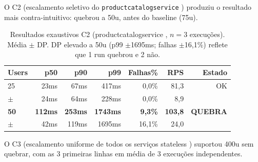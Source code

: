 \documentclass[manuscript,oneside]{acmart}
\begin{document}
O C2 (escalamento seletivo do \texttt{productcatalogservice} ) produziu o resultado mais contra-intuitivo: quebrou a 50u, antes do baseline (75u).

\begin{table}[H]
\caption{Resultados exaustivos C2 (productcatalogservice , $n=3$ execuções). Média $\pm$ DP. DP elevado a 50u (p99 $\pm$1695ms; falhas $\pm$16,1\%) reflete que 1 run quebrou e 2 não.}
\label{tab:c2ex}
\begin{tabular}{lrrrrrr}
\toprule
\textbf{Users} & \textbf{p50} & \textbf{p90} & \textbf{p99} & \textbf{Falhas\%} & \textbf{RPS} & \textbf{Estado} \\
\midrule
25 & 23ms & 67ms & 417ms & 0,0\% & 81,3 & OK \\
{\scriptsize$\pm$} & {\scriptsize24ms} & {\scriptsize64ms} & {\scriptsize228ms} & {\scriptsize0,0\%} & {\scriptsize8,9} & \\[-4pt]
\addlinespace[2pt]
\textbf{50} & \textbf{112ms} & \textbf{253ms} & \textbf{1743ms} & \textbf{9,3\%} & \textbf{103,8} & \textbf{QUEBRA} \\
{\scriptsize$\pm$} & {\scriptsize42ms} & {\scriptsize119ms} & {\scriptsize1695ms} & {\scriptsize16,1\%} & {\scriptsize24,0} & \\[-4pt]
\bottomrule
\end{tabular}
\end{table}

O C3 (escalamento uniforme de todos os serviços stateless ) suportou 400u sem quebrar, com as 3 primeiras linhas em média de 3 execuções independentes.
\end{document}
